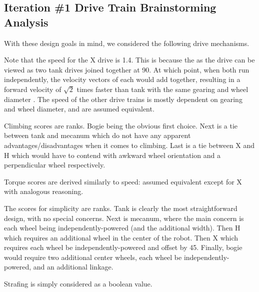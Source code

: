 \subsection{Iteration \#1 Drive Train Brainstorming Analysis}
With these design goals in mind, we considered the following drive mechanisms.
\par Note that the speed for the X drive is 1.4. This is because the as the
drive can be viewed as two tank drives joined together at 90\degree{}. At which
point, when both run independently, the velocity vectors of each would add
together, resulting in a forward velocity of $\sqrt{2}$ times faster than tank
with the same gearing and wheel diameter \cite{bib:mecandomniforceanalysis}. The
speed of the other drive trains is mostly dependent on gearing and wheel
diameter, and are assumed equivalent. \par Climbing scores are ranks. Bogie
being the obvious first choice. Next is a tie between tank and mecanum which do
not have any apparent advantages/disadvantages when it comes to climbing. Last
is a tie between X and H which would have to contend with awkward wheel
orientation and a perpendicular wheel respectively. \par Torque scores are
derived similarly to speed: assumed equivalent except for X with analogous
reasoning. \par The scores for simplicity are ranks. Tank is clearly the most
straightforward design, with no special concerns. Next is mecanum, where the
main concern is each wheel being independently-powered (and the additional
width). Then H which requires an additional wheel in the center of the robot.
Then X which requires each wheel be independently-powered and offset by
45\degree{}. Finally, bogie would require two additional center wheels, each
wheel be independently-powered, and an additional linkage. \par Strafing is
simply considered as a boolean value.

